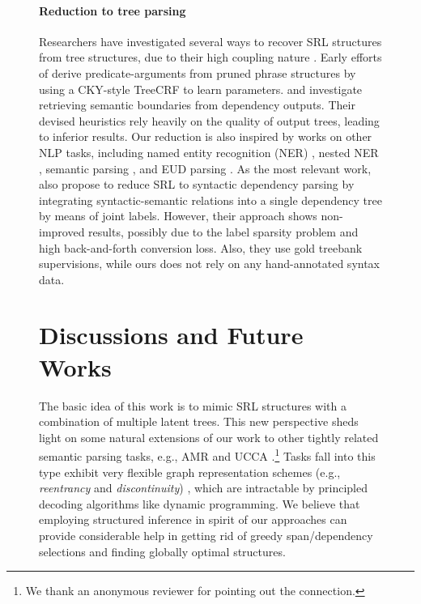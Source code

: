 \documentclass[11pt]{article}
\begin{document}
\begin{figure}[tb!]
\paragraph{Reduction to tree parsing}
Researchers have investigated several ways to recover SRL structures from tree structures, due to their high coupling nature \cite{palmer-etal-2005-propbank}.
Early efforts of \citet{cohn-blunsom-2005-semantic} derive predicate-arguments from pruned phrase structures by using a CKY-style TreeCRF to learn parameters.
\citet{johansson-nugues-2008-dependency} and \citet{choi-palmer-2010-retrieving} investigate retrieving semantic boundaries from dependency outputs.
Their devised heuristics rely heavily on the quality of output trees, leading to inferior results.
Our reduction is also inspired by works on other NLP tasks, including named entity recognition (NER) \cite{yu-etal-2020-named}, nested NER \cite{fu-etal-2021-nested,lou-etal-2022-nested}, semantic parsing \cite{sun-etal-2017-semantic,jiang-etal-2019-hlt}, and EUD parsing \cite{anderson-gomez-rodriguez-2021-splitting}.
As the most relevant work, \citet{shi-etal-2020-semantic} also propose to reduce SRL to syntactic dependency parsing by integrating syntactic-semantic relations into a single dependency tree by means of joint labels.
However, their approach shows non-improved results, possibly due to the label sparsity problem and high back-and-forth conversion loss.
Also, they use gold treebank supervisions, while ours does not rely on any hand-annotated syntax data.

\section{Discussions and Future Works}
The basic idea of this work is to mimic SRL structures with a combination of multiple latent trees.
This new perspective sheds light on some natural extensions of our work to other tightly related semantic parsing tasks, e.g., AMR \cite{zhang-etal-2019-amr} and UCCA \cite{jiang-etal-2019-hlt}.\footnote{We thank an anonymous reviewer for pointing out the connection.}
Tasks fall into this type exhibit very flexible graph representation schemes (e.g., \emph{reentrancy} and \emph{discontinuity}) \cite{zhang-etal-2019-broad}, which are intractable by principled decoding algorithms like dynamic programming.
We believe that employing structured inference in spirit of our approaches can provide considerable help in getting rid of greedy span/dependency selections and finding globally optimal structures.


\end{figure}
\end{document}
